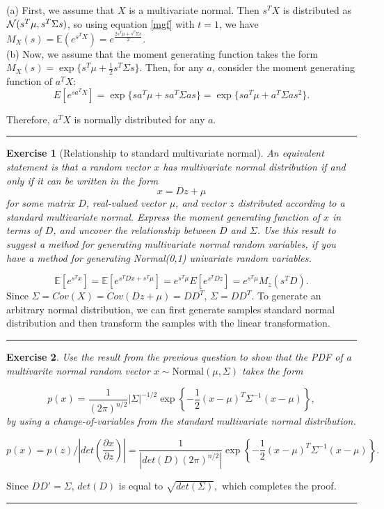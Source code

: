 \documentclass[twoside]{article}
\newcounter{lecnum}
\newtheorem{exercise}{Exercise}[lecnum]
\newenvironment{proof}{{\bf Proof:}}{\hfill\rule{2mm}{2mm}}
\newcommand\E{\mathbb{E}}
\begin{document}
\begin{proof}
(a) First, we assume that $X$ is a multivariate normal. Then $s^TX$ is distributed as ${\cal N}(s^T\mu, s^T\Sigma s)$, so using equation \ref{mgf} with $t = 1$, we have $M_X(s) = \E(e^{s^TX}) = e^{\frac{2s^T\mu+s^T\Sigma s}{2}}$.\\
(b) Now, we assume that the moment generating function takes the form $M_X(s) = \exp\{s^T\mu + \frac 12 s^T\Sigma s\}$. Then, for any $a$, consider the moment generating function of $a^TX$:
$$E[e^{sa^TX}] = \exp\{sa^T\mu+sa^T\Sigma as\} = \exp\{sa^T\mu+a^T\Sigma as^2\}.$$

Therefore, $a^TX$ is normally distributed for any $a$.

\end{proof}

\begin{exercise}[Relationship to standard multivariate normal]
  An equivalent statement is that a random vector $x$ has multivariate normal distribution if and only if it can be written in the form
  $$x = Dz + \mu$$
  for some matrix $D$, real-valued vector $\mu$, and vector $z$ distributed according to a standard multivariate normal. Express the moment generating function of $x$ in terms of $D$, and uncover the relationship between $D$ and $\Sigma$. Use this result to suggest a method for generating multivariate normal random variables, if you have a method for generating Normal(0,1) univariate random variables.
\end{exercise}

\begin{proof}
$$\E[e^{s^Tx}] = \E[e^{s^TDx+s^T\mu}] = e^{s^T\mu}E[e^{s^TDz}] = e^{s^T\mu}M_z(s^TD).$$
Since $\Sigma = Cov(X) = Cov(Dz+\mu) = DD^T$, $\Sigma = DD^T$. To generate an arbitrary normal distribution, we can first generate samples standard normal distribution and then transform the samples with the linear transformation.
\end{proof}

\begin{exercise}
  Use the result from the previous question to show that the PDF of a multivarite normal random vector $x\sim\mbox{Normal}(\mu, \Sigma)$ takes the form

  $$p(x) = \frac{1}{(2\pi)^{n/2}}|\Sigma|^{-1/2}\exp\left\{-\frac{1}{2}(x-\mu)^T\Sigma^{-1}(x-\mu)\right\},$$
by using a change-of-variables from the standard multivariate normal distribution.
\end{exercise}
\begin{proof}
$$p(x) = p(z)/|det(\frac{\partial x}{\partial z})| = \frac{1}{|det(D)(2\pi)^{n/2}|} \exp\left\{-\frac{1}{2}(x-\mu)^T\Sigma^{-1}(x-\mu)\right\}.$$

Since $DD' = \Sigma$, $det(D)$ is equal to $ \sqrt{det(\Sigma)},$ which completes the proof.
\end{proof}
\end{document}
